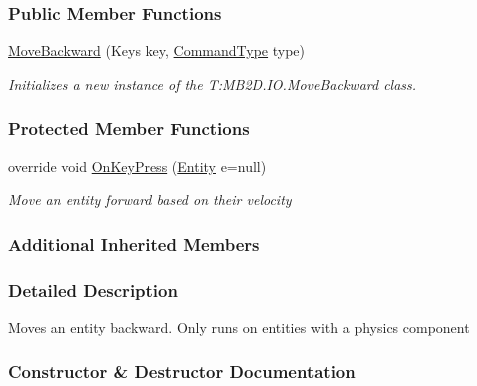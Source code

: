 \subsubsection*{Public Member Functions}
\begin{DoxyCompactItemize}
\item 
\hyperlink{class_m_b2_d_1_1_i_o_1_1_move_backward_a2c041f3a72975a1bda8c8a69e0556230}{Move\+Backward} (Keys key, \hyperlink{namespace_m_b2_d_1_1_i_o_ab5f95f3fe9e652778b62bdf943168a68}{Command\+Type} type)
\begin{DoxyCompactList}\small\item\em Initializes a new instance of the T\+:\+M\+B2\+D.\+I\+O.\+Move\+Backward class. \end{DoxyCompactList}\end{DoxyCompactItemize}
\subsubsection*{Protected Member Functions}
\begin{DoxyCompactItemize}
\item 
override void \hyperlink{class_m_b2_d_1_1_i_o_1_1_move_backward_a15c5da82d35b95c0a04e8fdc89dcd839}{On\+Key\+Press} (\hyperlink{class_m_b2_d_1_1_entity_component_1_1_entity}{Entity} e=null)
\begin{DoxyCompactList}\small\item\em Move an entity forward based on their velocity \end{DoxyCompactList}\end{DoxyCompactItemize}
\subsubsection*{Additional Inherited Members}


\subsubsection{Detailed Description}
Moves an entity backward. Only runs on entities with a physics component 



\subsubsection{Constructor \& Destructor Documentation}
\hypertarget{class_m_b2_d_1_1_i_o_1_1_move_backward_a2c041f3a72975a1bda8c8a69e0556230}{}\label{class_m_b2_d_1_1_i_o_1_1_move_backward_a2c041f3a72975a1bda8c8a69e0556230} 
